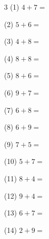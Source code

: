 \documentclass[a4paper, 11pt]{ltjsarticle}
\begin{document}
\hfill

\vspace*{2ex}

\vspace*{5ex}

\begin{multicols*}{3}
\noindent (1) \quad $4 + 7 =$
\vspace*{\fill}

\noindent (2) \quad $5 + 6 =$
\vspace*{\fill}

\noindent (3) \quad $4 + 8 =$
\vspace*{\fill}

\noindent (4) \quad $8 + 8 =$
\vspace*{\fill}

\noindent (5) \quad $8 + 6 =$
\vspace*{\fill}

\noindent (6) \quad $9 + 7 =$
\vspace*{\fill}

\noindent (7) \quad $6 + 8 =$
\vspace*{\fill}

\noindent (8) \quad $6 + 9 =$
\vspace*{\fill}

\noindent (9) \quad $7 + 5 =$
\vspace*{\fill}

\noindent (10) \quad $5 + 7 =$
\vspace*{\fill}

\noindent (11) \quad $8 + 4 =$
\vspace*{\fill}

\noindent (12) \quad $9 + 4 =$
\vspace*{\fill}
\columnbreak

\noindent (13) \quad $6 + 7 =$
\vspace*{\fill}

\noindent (14) \quad $2 + 9 =$
\vspace*{\fill}


\end{multicols*}
\end{document}

